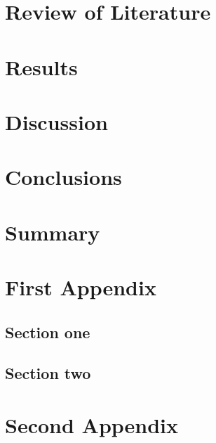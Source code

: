 \documentclass[doublespace,draft,nopageskip,prelim]{VTthesis} %
\begin{document}
    \chapter{Review of Literature} \label{ch:lit_review}
	\chapter{Results} \label{ch:results}
	\chapter{Discussion} \label{ch:discussion}
	\chapter{Conclusions} \label{ch:conclusions}
	\chapter{Summary} \label{ch:summary}


	\appendix

	\begin{appendices}
		\chapter{First Appendix} \label{app:appendix_one}
			\section{Section one} \label{ase:app_one_sect_1}
				\lipsum[1-3]
			\section{Section two} \label{ase:app_one_sect_2}
				\lipsum[1-3]
		\chapter{Second Appendix} \label{app:appendix_two}
			\lipsum[2]
	\end{appendices}
\end{document}

